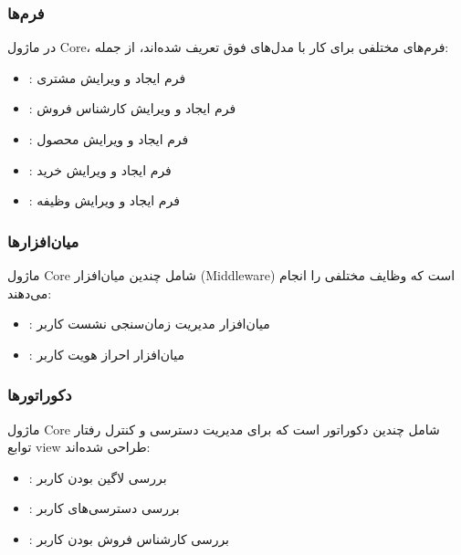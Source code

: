 \documentclass[letterpaper,10pt,english]{sphinxmanual}
\begin{document}
\subsubsection{فرم‌ها}
\label{\detokenize{modules/core:id2}}
\sphinxAtStartPar
در ماژول Core، فرم‌های مختلفی برای کار با مدل‌های فوق تعریف شده‌اند، از جمله:
\begin{itemize}
\item {} 
\sphinxAtStartPar
{}: فرم ایجاد و ویرایش مشتری

\item {} 
\sphinxAtStartPar
{}: فرم ایجاد و ویرایش کارشناس فروش

\item {} 
\sphinxAtStartPar
{}: فرم ایجاد و ویرایش محصول

\item {} 
\sphinxAtStartPar
{}: فرم ایجاد و ویرایش خرید

\item {} 
\sphinxAtStartPar
{}: فرم ایجاد و ویرایش وظیفه

\end{itemize}


\subsubsection{میان‌افزارها}
\label{\detokenize{modules/core:id3}}
\sphinxAtStartPar
ماژول Core شامل چندین میان‌افزار (Middleware) است که وظایف مختلفی را انجام می‌دهند:
\begin{itemize}
\item {} 
\sphinxAtStartPar
{}: میان‌افزار مدیریت زمان‌سنجی نشست کاربر

\item {} 
\sphinxAtStartPar
{}: میان‌افزار احراز هویت کاربر

\end{itemize}


\subsubsection{دکوراتورها}
\label{\detokenize{modules/core:id4}}
\sphinxAtStartPar
ماژول Core شامل چندین دکوراتور است که برای مدیریت دسترسی و کنترل رفتار توابع view طراحی شده‌اند:
\begin{itemize}
\item {} 
\sphinxAtStartPar
{}: بررسی لاگین بودن کاربر

\item {} 
\sphinxAtStartPar
{}: بررسی دسترسی‌های کاربر

\item {} 
\sphinxAtStartPar
{}: بررسی کارشناس فروش بودن کاربر

\end{itemize}
\end{document}
